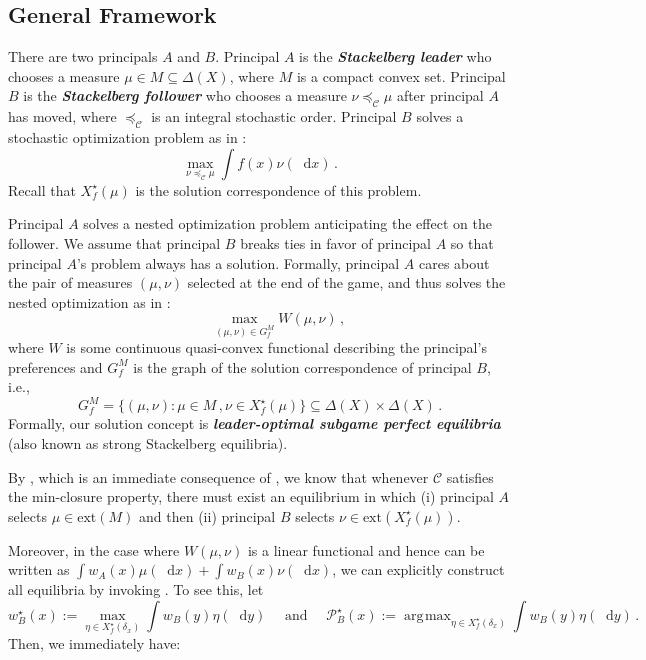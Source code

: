\documentclass[12pt,letterpaper]{article}
\newenvironment{original}{\color{black}}{}
\DeclareMathOperator*{\argmax}{\arg\!\max}
\theoremstyle{plain}
\theoremstyle{definition}
\theoremstyle{remark}
\newcommand{\C}{\mathcal{C}}
\newcommand{\Ext}{\mathrm{ext}}
\renewcommand*\d{\mathop{}\!\mathrm{d}}
\theoremstyle{definition}
\begin{document}
\subsection{General Framework}
\begin{original}
There are two principals $A$ and $B$. Principal $A$ is the \textit{\textbf{Stackelberg leader}} who chooses a measure $\mu \in M \subseteq \Delta(X)$, where $M$ is a compact convex set. Principal $B$ is the \textit{\textbf{Stackelberg follower}} who chooses a measure $\nu \preceq_{\C} \mu$ after principal $A$ has moved, where $\preceq_\C$ is an integral stochastic order. Principal $B$ solves a stochastic optimization problem as in :
\[\max_{\nu \preceq_\C \mu}\int f(x) \nu(\d x)\,.\]
Recall that $X^\star_f(\mu)$ is the solution correspondence of this problem.

Principal $A$ solves a nested optimization problem anticipating the effect on the follower. We assume that principal $B$ breaks ties in favor of principal $A$ so that principal $A$'s problem always has a solution. Formally, principal $A$ cares about the pair of measures $(\mu, \nu)$ selected at the end of the game, and thus solves the nested optimization as in :
\begin{equation*}
\text{ } \qquad \max_{(\mu,\nu) \in G^M_f} W(\mu,\nu)\,,
\end{equation*}
where $W$ is some continuous quasi-convex functional describing the principal's preferences and $G^M_f$ is the graph of the solution correspondence of principal $B$, i.e.,
\[G^M_f = \big\{(\mu,\nu): \mu \in M\,, \nu \in X^\star_f(\mu)\big\} \subseteq \Delta(X) \times \Delta(X)\,.\]
Formally, our solution concept is \textit{\textbf{leader-optimal subgame perfect equilibria}} (also known as strong Stackelberg equilibria).

By , which is an immediate consequence of , we know that whenever $\C$ satisfies the min-closure property, there must exist an equilibrium in which (i) principal $A$ selects $\mu \in \Ext(M)$ and then (ii) principal $B$ selects $\nu \in \Ext(X^{\star}_f(\mu))$.

Moreover, in the case where $W(\mu, \nu)$ is a linear functional and hence can be written as $\int w_A(x) \mu(\d x) + \int w_B(x) \nu(\d x)$, we can explicitly construct all equilibria by invoking . To see this, let
\[w_B^\star(x):= \max_{\eta \in X^\star_f(\delta_x)} \int w_B(y) \eta(\d y) \quad \text{ and }\quad \mathcal{P}^\star_B(x):= \argmax_{\eta \in X^\star_f(\delta_x)} \int w_B(y) \eta(\d y)\,.\]
Then, we immediately have:
\end{original}
\end{document}

